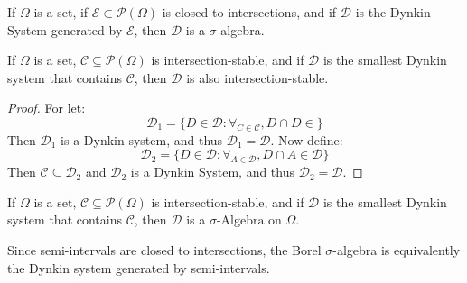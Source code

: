     \begin{theorem}
        If $\Omega$ is a set, if
        $\mathcal{E}\subset\mathcal{P}(\Omega)$ is closed
        to intersections, and if $\mathcal{D}$ is the
        Dynkin System generated by $\mathcal{E}$, then
        $\mathcal{D}$ is a $\sigma$-algebra.
    \end{theorem}
    \begin{theorem}
        If $\Omega$ is a set, $\mathcal{C}\subseteq\mathcal{P}(\Omega)$
        is intersection-stable, and if $\mathcal{D}$ is the smallest
        Dynkin system that contains $\mathcal{C}$, then $\mathcal{D}$
        is also intersection-stable.
    \end{theorem}
    \begin{proof}
        For let:
        \begin{equation}
            \mathcal{D}_{1}=
            \{D\in\mathcal{D}:\forall_{C\in\mathcal{C}},D\cap{D}\in\mathcal{}\}
        \end{equation}
        Then $\mathcal{D}_{1}$ is a Dynkin system, and thus
        $\mathcal{D}_{1}=\mathcal{D}$. Now define:
        \begin{equation}
            \mathcal{D}_{2}=\{
                D\in\mathcal{D}:
                \forall_{A\in\mathcal{D}},D\cap{A}\in\mathcal{D}\}
        \end{equation}
        Then $\mathcal{C}\subseteq\mathcal{D}_{2}$ and $\mathcal{D}_{2}$ is a
        Dynkin System, and thus $\mathcal{D}_{2}=\mathcal{D}$.
    \end{proof}
    \begin{theorem}
        If $\Omega$ is a set, $\mathcal{C}\subseteq\mathcal{P}(\Omega)$
        is intersection-stable, and if $\mathcal{D}$ is the smallest
        Dynkin system that contains $\mathcal{C}$, then $\mathcal{D}$
        is a $\sigma\textrm{-Algebra}$ on $\Omega$.
    \end{theorem}
    Since semi-intervals are closed to intersections,
    the Borel $\sigma$-algebra is equivalently the
    Dynkin system generated by semi-intervals.